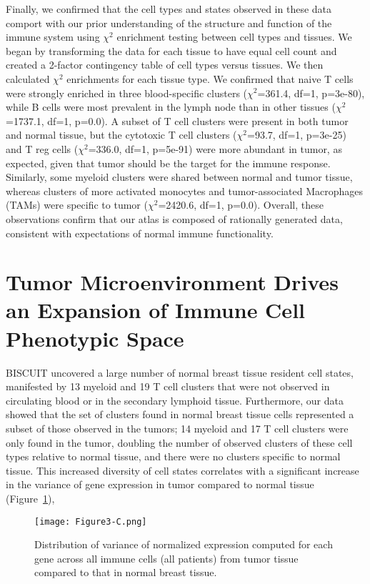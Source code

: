 Finally, we confirmed that the cell types and states observed in these data comport with our prior understanding of the structure and function of the immune system using $\chi^2$ enrichment testing between cell types and tissues.
We began by transforming the data for each tissue to have equal cell count and created a 2-factor contingency table of cell types versus tissues.
We then calculated \(\chi^{2}\) enrichments for each tissue type. 
We confirmed that naive T cells were strongly enriched in three blood-specific clusters (\(\chi^{2}\)=361.4, df=1, p=3e-80), while B cells were most prevalent in the lymph node than in other tissues (\(\chi^{2}\)=1737.1, df=1, p=0.0).
A subset of T cell clusters were present in both tumor and normal tissue, but the cytotoxic T cell clusters (\(\chi^{2}\)=93.7, df=1, p=3e-25) and T reg cells (\(\chi^{2}\)=336.0, df=1, p=5e-91) were more abundant in tumor, as expected, given that tumor should be the target for the immune response.
Similarly, some myeloid clusters were shared between normal and tumor tissue, whereas clusters of more activated monocytes and tumor-associated Macrophages (TAMs) were specific to tumor (\(\chi^{2}\)=2420.6, df=1, p=0.0).
Overall, these observations confirm that our atlas is composed of rationally generated data, consistent with expectations of normal immune functionality. 

\section{Tumor Microenvironment Drives an Expansion of Immune Cell Phenotypic Space}

BISCUIT uncovered a large number of normal breast tissue resident cell states, manifested by 13 myeloid and 19 T cell clusters that were not observed in circulating blood or in the secondary lymphoid tissue.
Furthermore, our data showed that the set of clusters found in normal breast tissue cells represented a subset of those observed in the tumors; 14 myeloid and 17 T cell clusters were only found in the tumor, doubling the number of observed clusters of these cell types relative to normal tissue, and there were no clusters specific to normal tissue.
This increased diversity of cell states correlates with a significant increase in the variance of gene expression in tumor compared to normal tissue (Figure~\ref{fig:3c}),

\begin{figure}
\centering
\texttt{[image: Figure3-C.png]}
\caption{Distribution of variance of normalized expression computed for each gene across all immune cells (all patients) from tumor tissue compared to that in normal breast tissue.
}
\label{fig:3c}
\end{figure}

